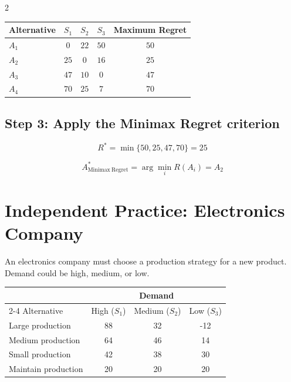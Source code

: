 \begin{multicols}{2}
		\begin{center}
			\renewcommand{\arraystretch}{1.5}
			\small
			\begin{tabular}{lcccc}
				\toprule
				Alternative & $S_1$ & $S_2$ & $S_3$ & Maximum Regret \\
				\midrule
				$A_1$ & $0$ & $22$ & $50$ & $50$ \\[3pt]
				$A_2$ & $25$ & $0$ & $16$ & $25$ \\[3pt]
				$A_3$ & $47$ & $10$ & $0$ & $47$ \\[3pt]
				$A_4$ & $70$ & $25$ & $7$ & $70$ \\
				\bottomrule
			\end{tabular}
		\end{center}
		
		\subsection*{Step 3: Apply the Minimax Regret criterion}
		
		\[
		R^*
		=
		\min\{50,25,47,70\}
		=
		25
		\]
		
		\[
		A^*_{\mathrm{Minimax\ Regret}}
		=
		\arg\min_i R(A_i)
		=
		A_2
		\]
		
		\columnbreak
		
		\section{Independent Practice: Electronics Company}
		
		An electronics company must choose a production strategy for a new product.
		Demand could be high, medium, or low.
		
		\begin{center}
			\renewcommand{\arraystretch}{1.3}
			\small
			\begin{tabular}{lccc}
				\toprule
				& \multicolumn{3}{c}{Demand} \\
				\cmidrule(lr){2-4}
				Alternative & High ($S_1$) & Medium ($S_2$) & Low ($S_3$) \\
				\midrule
				Large production  & 88 & 32 & -12 \\
				Medium production & 64 & 46 & 14 \\
				Small production  & 42 & 38 & 30 \\
				Maintain production & 20 & 20 & 20 \\
				\bottomrule
			\end{tabular}
		\end{center}
		

\end{multicols}
